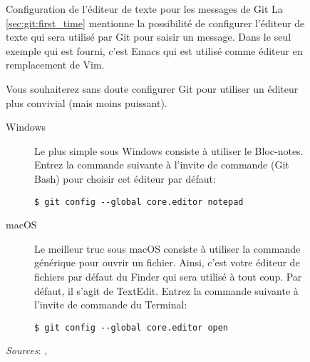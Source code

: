 
\begin{figure}[t]
  \label{fig:git:editeur}
  \begin{emphbox}{\mdseries Configuration de l'éditeur de texte pour
      les messages de Git}
    La \autoref{sec:git:first_time} mentionne la possibilité de
    configurer l'éditeur de texte qui sera utilisé par Git pour saisir
    un message. Dans le seul exemple qui est fourni, c'est Emacs qui
    est utilisé comme éditeur en remplacement de Vim.

    Vous souhaiterez sans doute configurer Git pour utiliser un
    éditeur plus convivial (mais moins puissant).

    \begin{description}
    \item[Windows]
    Le plus simple sous Windows consiste à utiliser le Bloc-notes.
    Entrez la commande suivante à l'invite de commande (Git Bash) pour
    choisir cet éditeur par défaut:
    \begin{Schunk}
\begin{Verbatim}
$ git config --global core.editor notepad
\end{Verbatim}
    \end{Schunk}%

    \item[macOS]
    Le meilleur truc sous macOS consiste à utiliser la commande
    générique  pour ouvrir un fichier. Ainsi, c'est votre
    éditeur de fichiers par défaut du Finder qui sera utilisé à tout
    coup. Par défaut, il s'agit de TextEdit. Entrez la commande
    suivante à l'invite de commande du Terminal:
    \begin{Schunk}
\begin{Verbatim}
$ git config --global core.editor open
\end{Verbatim}
    \end{Schunk}
  \end{description}

    \emph{Sources}:
    ,
  \end{emphbox}
\end{figure}


